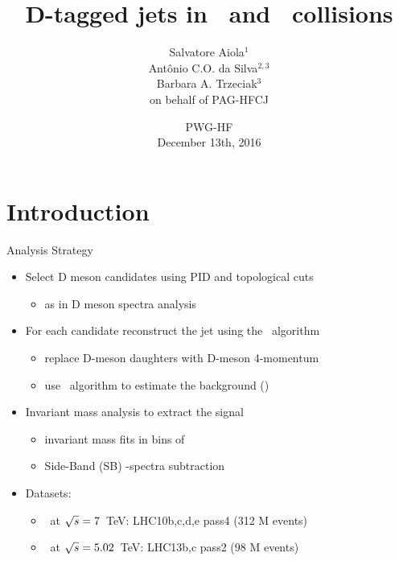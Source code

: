 \documentclass[xcolor={usenames,dvipsnames}]{beamer}
\title[D-tagged jets in \pp\ and \pPb\ collisions] %
{D-tagged jets in \pp\ and \pPb\ collisions}
\author[Salvatore Aiola]%
{Salvatore Aiola$^{1}$ \\
Ant\^onio C.O. da Silva$^{2,3}$ \\
Barbara A. Trzeciak$^{3}$ \\ 
\bigskip
on behalf of PAG-HFCJ}
\institute[Yale University] %
{$^{1}$Yale University\\
$^{2}$University of S\~ao Paulo \\
$^{3}$Utrecht University}
\date[PWG-HF - Dec. 13th, 2016] %
{PWG-HF \\
December 13th, 2016}
\begin{document}
\begin{frame}
  \titlepage
\end{frame}






\section{Introduction}

\begin{frame}{Analysis Strategy}
\begin{itemize}
\item Select D meson candidates using PID and topological cuts
\begin{itemize}
\item as in D meson spectra analysis
\end{itemize}
\item For each candidate reconstruct the jet using the \antikt\ algorithm
\begin{itemize}
\item replace D-meson daughters with D-meson 4-momentum
\item use \kt\ algorithm to estimate the background (\pPb)
\end{itemize}
\item Invariant mass analysis to extract the signal
\begin{itemize}
\item invariant mass fits in bins of \ptjet
\item Side-Band (SB) \ptjet-spectra subtraction
\end{itemize}
\item Datasets:
\begin{itemize}
\item \pp\ at $\sqrt{s}=7$~TeV: LHC10b,c,d,e pass4 (312 M events)
\item \pPb\ at $\sqrt{s}=5.02$~TeV: LHC13b,c pass2 (98 M events)
\end{itemize}
\end{itemize}
\end{frame}
\end{document}
